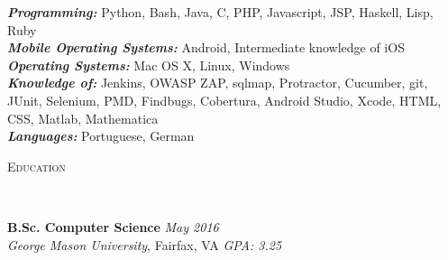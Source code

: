 \documentclass[9pt]{article}
\newenvironment{changemargin}[2]{%
  \begin{list}{}{%
    \setlength{\topsep}{0pt}%
    \setlength{\leftmargin}{#1}%
    \setlength{\rightmargin}{#2}%
    \setlength{\listparindent}{\parindent}%
    \setlength{\itemindent}{\parindent}%
    \setlength{\parsep}{\parskip}%
  }%
  \item[]}{\end{list}
}
\newcommand{\lineover}{
	\begin{changemargin}{-0.05in}{-0.05in}
		\vspace*{-8pt}
		\hrulefill \\
		\vspace*{-2pt}
	\end{changemargin}
}
\newcommand{\header}[1]{
	\begin{changemargin}{-0.5in}{-0.5in}
		\scshape{#1}\\
  	\lineover
	\end{changemargin}
}
\newenvironment{body} {
	\vspace*{-10pt}
	\begin{changemargin}{-0.25in}{-0.5in}
  }	
	{\end{changemargin}
}
\begin{document}
\begin{body}
	\vspace{14pt}
	\emph{\textbf{Programming:}}{} Python, Bash, Java, C, PHP, Javascript, JSP, Haskell, Lisp, Ruby\\
	\smallskip
	\emph{\textbf{Mobile Operating Systems:}}{} Android, Intermediate knowledge of iOS\\
	\smallskip
	\emph{\textbf{Operating Systems:}}{} Mac OS X, Linux, Windows\\
	\smallskip
	\emph{\textbf{Knowledge of:}}{} Jenkins, OWASP ZAP, sqlmap, Protractor, Cucumber, git, JUnit, Selenium, PMD, Findbugs, Cobertura, Android Studio, Xcode, HTML, CSS, Matlab, Mathematica \\
	\smallskip
	\emph{\textbf{Languages:}}{} Portuguese, German \\
\end{body}
\vspace{14pt}
\header{Education}

\begin{body}
	\vspace{14pt}
	\textbf{B.Sc. Computer Science }{} \hfill \emph{May 2016}{} \\
	\emph{George Mason University}, Fairfax, VA \hfill \emph{GPA: 3.25} \\
	\vspace{4pt}
\end{body}
\vspace{10pt}
\smallskip

%
\end{document}
